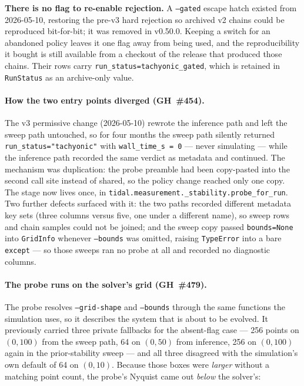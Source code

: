 \textbf{There is no flag to re-enable rejection.}  A \texttt{--gated}
escape hatch existed from 2026-05-10, restoring the pre-v3 hard
rejection so archived v2 chains could be reproduced bit-for-bit; it was
removed in v0.50.0.  Keeping a switch for an abandoned policy leaves it
one flag away from being used, and the reproducibility it bought is
still available from a checkout of the release that produced those
chains.  Their rows carry \texttt{run\_status=tachyonic\_gated}, which
is retained in \texttt{RunStatus} as an archive-only value.

\paragraph{How the two entry points diverged (GH~\#454).}  The v3
permissive change (2026-05-10) rewrote the inference path and left the
sweep path untouched, so for four months the sweep path silently
returned \texttt{run\_status="tachyonic"} with \texttt{wall\_time\_s
= 0} --- never simulating --- while the inference path recorded the
same verdict as metadata and continued.  The mechanism was duplication:
the probe preamble had been copy-pasted into the second call site
instead of shared, so the policy change reached only one copy.  The
stage now lives once, in
\texttt{tidal.measurement.\_stability.probe\_for\_run}.  Two further
defects surfaced with it: the two paths recorded different metadata key
sets (three columns versus five, one under a different name), so sweep
rows and chain samples could not be joined; and the sweep copy passed
\texttt{bounds=None} into \texttt{GridInfo} whenever \texttt{--bounds}
was omitted, raising \texttt{TypeError} into a bare \texttt{except} ---
so those sweeps ran no probe at all and recorded no diagnostic columns.

\paragraph{The probe runs on the solver's grid (GH~\#479).}  The probe
resolves \texttt{--grid-shape} and \texttt{--bounds} through the same
functions the simulation uses, so it describes the system that is about
to be evolved.  It previously carried three private fallbacks for the
absent-flag case --- 256 points on $(0,100)$ from the sweep path, 64 on
$(0,50)$ from inference, 256 on $(0,100)$ again in the prior-stability
sweep --- and all three disagreed with the simulation's own default of
64 on $(0,10)$.  Because those boxes were \emph{larger} without a
matching point count, the probe's Nyquist came out \emph{below} the
solver's:


